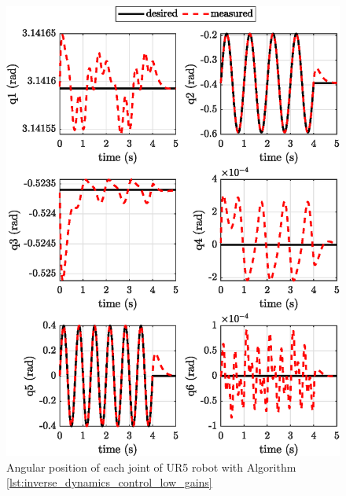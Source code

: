 \begin{figure}[H]
    \centering
    \includegraphics{images/act_2.3/joint_position.eps}
    \caption{Angular position of each joint of UR5 robot with Algorithm \ref{lst:inverse_dynamics_control_low_gains}}
    \label{fig:act_2.3_joint_position}
\end{figure}

